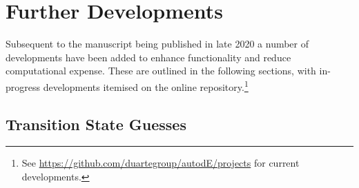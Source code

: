 \documentclass[../../main.tex]{subfiles}
\begin{document}
\setcounter{footnote}{0} 

\newcommand{\ade}{\emph{autodE }}


\section{Further Developments}

Subsequent to the manuscript being published in late 2020 a number of developments have been added to enhance functionality and reduce computational expense. These are outlined in the following sections, with in-progress developments itemised on the online repository.\footnote{See \url{https://github.com/duartegroup/autodE/projects} for current developments.}

\subsection{Transition State Guesses}
\end{document}
